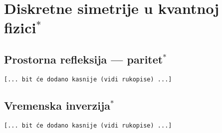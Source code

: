 
\chapter{Diskretne simetrije u kvantnoj fizici$^*$}

\section{Prostorna refleksija --- paritet$^*$}

\texttt{[... bit će dodano kasnije (vidi rukopise) ...]}

\section{Vremenska inverzija$^*$}
\label{sec:tinverzija}

\texttt{[... bit će dodano kasnije (vidi rukopise) ...]}

